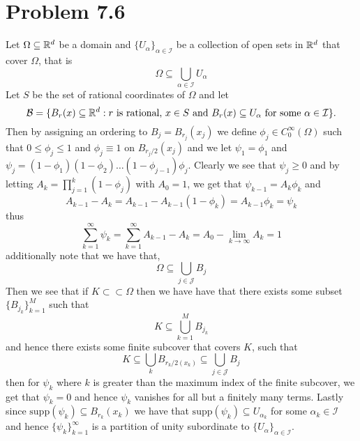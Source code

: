 \documentclass[12pt]{report}
\begin{document}
\section*{Problem 7.6}
Let $\Omega \subseteq \mathbb{R}^d$ be a domain and $\{U_\alpha\}_{\alpha \in \mathcal{I}}$ be a collection of open sets in $\mathbb{R}^d$ that cover $\Omega$, that is
\begin{equation*}
  \Omega \subseteq \bigcup_{\alpha \in \mathcal{I}} U_\alpha
\end{equation*}
Let $S$ be the set of rational coordinates of $\Omega$ and let
\begin{equation*}
  \mathcal{B} = \{B_r(x) \subseteq \mathbb{R}^d: \text{$r$ is rational, $x \in S$ and $B_r(x) \subseteq U_{\alpha}$ for some $\alpha \in\mathcal{I}$}\}.
\end{equation*}
Then by assigning an ordering to $B_j = B_{r_j}(x_j)$ we define $\phi_j \in C_0^\infty(\Omega)$ such that $0 \leq \phi_j \leq 1$ and $\phi_j \equiv 1$ on $B_{r_j/2}(x_j)$ and we let $\psi_1 = \phi_1$ and $\psi_j = (1-\phi_1)(1-\phi_2)\dots(1-\phi_{j-1})\phi_j$. Clearly we see that $\psi_j \geq 0$ and by letting $A_k = \prod_{j=1}^k (1-\phi_j)$ with $A_0 = 1$, we get that $\psi_{k-1} = A_k\phi_k$ and
\begin{equation*}
  A_{k-1} - A_{k} = A_{k-1} - A_{k-1}(1-\phi_k) = A_{k-1}\phi_k = \psi_k
\end{equation*}
thus
\begin{equation*}
  \sum_{k=1}^\infty \psi_k = \sum_{k=1}^\infty A_{k-1} - A_k = A_0 - \lim_{k \to \infty} A_k = 1
\end{equation*}
additionally note that we have that,
\begin{equation*}
  \Omega \subseteq \bigcup_{j \in \mathcal{J}} B_j
\end{equation*}
Then we see that if $K \subset\subset \Omega$ then we have have that there exists some subset $\{B_{j_k}\}_{k=1}^M$ such that 
\begin{equation*}
  K \subseteq \bigcup_{k=1}^M B_{j_k}
\end{equation*}
and hence there exists some finite subcover that covers $K$, such that
\begin{equation*}
  K \subseteq \bigcup_{k} B_{r_k/2(x_k)} \subseteq \bigcup_{j \in \mathcal{J}} B_j
\end{equation*}
then for $\psi_k$ where $k$ is greater than the maximum index of the finite subcover, we get that $\psi_k = 0$ and hence $\psi_k$ vanishes for all but a finitely many terms. Lastly since $\text{supp}(\psi_k) \subseteq B_{r_k}(x_k)$ we have that $\text{supp}(\psi_k) \subseteq U_{\alpha_k}$ for some $\alpha_k \in \mathcal{I}$ and hence $\{\psi_k\}_{k=1}^\infty$ is a partition of unity subordinate to $\{U_\alpha\}_{\alpha \in \mathcal{I}}$.
\end{document}
